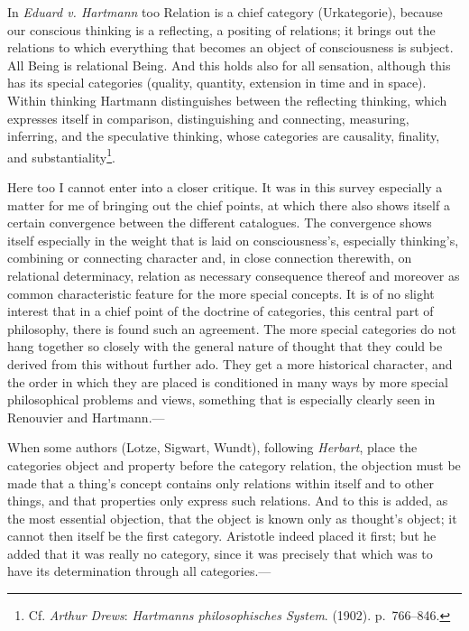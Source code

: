 \documentclass[12pt,a4paper]{book}
\newcommand{\opage}[1]{\marginnote{\footnotesize\textit{[#1]}}}
\begin{document}
In \emph{Eduard v. Hartmann} too Relation is a chief category (Urkategorie),
because our conscious thinking is a reflecting, a positing of relations; it
brings out the relations to which everything that becomes an object of
consciousness is subject. All Being is relational Being. And this holds also
for all sensation, although this has its special categories (quality,
quantity, extension in time and in space). Within thinking Hartmann
distinguishes between the reflecting thinking, which expresses itself in
comparison, distinguishing and connecting, measuring, inferring, and the
speculative thinking, whose categories are causality, finality, and
substantiality\footnote{Cf. \emph{Arthur Drews}: \emph{Hartmanns
philosophisches System}. (1902). p.~766--846.}.

Here too I cannot enter into a closer critique. It was in this survey
especially a matter for me of bringing out the chief points, at which there
also shows itself a certain \opage{153}convergence between the different catalogues. The
convergence shows itself especially in the weight that is laid on
consciousness's, especially thinking's, combining or connecting character
and, in close connection therewith, on relational determinacy, relation as
necessary consequence thereof and moreover as common characteristic feature
for the more special concepts. It is of no slight interest that in a chief
point of the doctrine of categories, this central part of philosophy, there
is found such an agreement. The more special categories do not hang together
so closely with the general nature of thought that they could be derived from
this without further ado. They get a more historical character, and the order
in which they are placed is conditioned in many ways by more special
philosophical problems and views, something that is especially clearly seen
in Renouvier and Hartmann.---

When some authors (Lotze, Sigwart, Wundt), following \emph{Herbart}, place
the categories object and property before the category relation, the
objection must be made that a thing's concept contains only relations within
itself and to other things, and that properties only express such relations.
And to this is added, as the most essential objection, that the object is
known only as thought's object; it cannot then itself be the first category.
Aristotle indeed placed it first; but he added that it was really no category,
since it was precisely that which was to have its determination through all
categories.---
\end{document}
